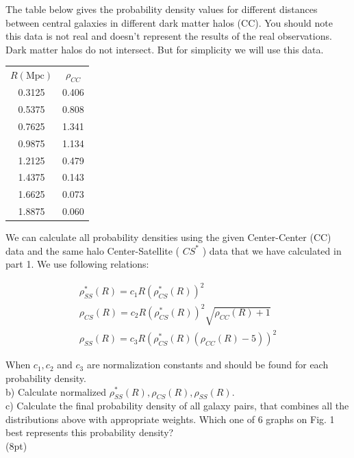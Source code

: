\documentclass[10pt]{article}
\begin{document}
The table below gives the probability density values for different distances between central galaxies in different dark matter halos (CC). You should note this data is not real and doesn't represent the results of the real observations. Dark matter halos do not intersect. But for simplicity we will use this data.

\begin{center}
\begin{tabular}{cc}
$R(\mathrm{Mpc})$ & $\rho_{C C}$ \\
0.3125 & 0.406 \\
0.5375 & 0.808 \\
0.7625 & 1.341 \\
0.9875 & 1.134 \\
1.2125 & 0.479 \\
1.4375 & 0.143 \\
1.6625 & 0.073 \\
1.8875 & 0.060 \\
\end{tabular}
\end{center}

We can calculate all probability densities using the given Center-Center (CC) data and the same halo Center-Satellite ( $C S^{*}$ ) data that we have calculated in part 1. We use following relations:

$$
\begin{gathered}
\rho_{S S}^{*}(R)=c_{1} R\left(\rho_{C S}^{*}(R)\right)^{2} \\
\rho_{C S}(R)=c_{2} R\left(\rho_{C S}^{*}(R)\right)^{2} \sqrt{\rho_{C C}(R)+1} \\
\rho_{S S}(R)=c_{3} R\left(\rho_{C S}^{*}(R)\left(\rho_{C C}(R)-5\right)\right)^{2}
\end{gathered}
$$

When $c_{1}, c_{2}$ and $c_{3}$ are normalization constants and should be found for each probability density.\\
b) Calculate normalized $\rho_{S S}^{*}(R), \rho_{C S}(R), \rho_{S S}(R)$.\\
c) Calculate the final probability density of all galaxy pairs, that combines all the distributions above with appropriate weights. Which one of 6 graphs on Fig. 1 best represents this probability density?\\
(8pt)
\end{document}
